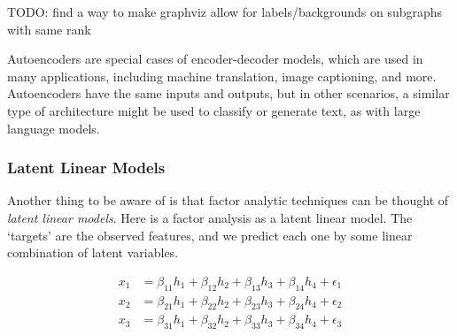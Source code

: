 \documentclass[
  letterpaper,
]{krantz}
\begin{document}
TODO: find a way to make graphviz allow for labels/backgrounds on
subgraphs with same rank

\begin{tcolorbox}[enhanced jigsaw, leftrule=.75mm, breakable, colback=white, left=2mm, colframe=quarto-callout-note-color-frame, toprule=.15mm, arc=.35mm, rightrule=.15mm, bottomrule=.15mm, opacityback=0]
\begin{minipage}[t]{5.5mm}
\textcolor{quarto-callout-note-color}{\faInfo}
\end{minipage}%
\begin{minipage}[t]{\textwidth - 5.5mm}

Autoencoders are special cases of encoder-decoder models, which are used
in many applications, including machine translation, image captioning,
and more. Autoencoders have the same inputs and outputs, but in other
scenarios, a similar type of architecture might be used to classify or
generate text, as with large language models.

\end{minipage}%
\end{tcolorbox}

\subsubsection{Latent Linear Models}\label{latent-linear-models}

Another thing to be aware of is that factor analytic techniques can be
thought of \emph{latent linear models}. Here is a factor analysis as a
latent linear model. The `targets' are the observed features, and we
predict each one by some linear combination of latent variables.

\[
\begin{aligned}
x_1 &= \beta_{11} h_1 + \beta_{12} h_2 + \beta_{13} h_3 + \beta_{14} h_4 + \epsilon_1 \\
x_2 &= \beta_{21} h_1 + \beta_{22} h_2 + \beta_{23} h_3 + \beta_{24} h_4 + \epsilon_2 \\
x_3 &= \beta_{31} h_1 + \beta_{32} h_2 + \beta_{33} h_3 + \beta_{34} h_4 + \epsilon_3 \\
\end{aligned}
\]
\end{document}
